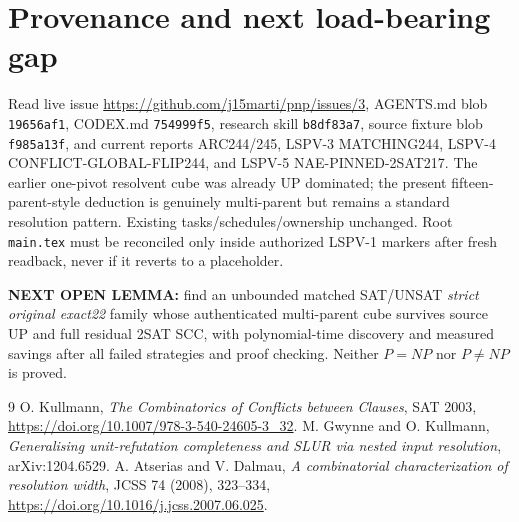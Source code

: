 \documentclass[10pt]{article}
\begin{document}
\section{Provenance and next load-bearing gap}
Read live issue \url{https://github.com/j15marti/pnp/issues/3}, AGENTS.md blob \texttt{19656af1}, CODEX.md \texttt{754999f5}, research skill \texttt{b8df83a7}, source fixture  blob \texttt{f985a13f}, and current reports ARC244/245, LSPV-3 MATCHING244, LSPV-4 CONFLICT-GLOBAL-FLIP244, and LSPV-5 NAE-PINNED-2SAT217. The earlier one-pivot resolvent cube was already UP dominated; the present fifteen-parent-style deduction is genuinely multi-parent but remains a standard resolution pattern. Existing tasks/schedules/ownership unchanged. Root \texttt{main.tex} must be reconciled only inside authorized LSPV-1 markers after fresh readback, never if it reverts to a placeholder.
\par\noindent\textbf{NEXT OPEN LEMMA:} find an unbounded matched SAT/UNSAT \emph{strict original exact22} family whose authenticated multi-parent cube survives source UP and full residual 2SAT SCC, with polynomial-time discovery and measured savings after all failed strategies and proof checking. Neither $P=NP$ nor $P\ne NP$ is proved.
\begin{thebibliography}{9}
 O. Kullmann, \emph{The Combinatorics of Conflicts between Clauses}, SAT 2003, \url{https://doi.org/10.1007/978-3-540-24605-3_32}.
 M. Gwynne and O. Kullmann, \emph{Generalising unit-refutation completeness and SLUR via nested input resolution}, arXiv:1204.6529.
 A. Atserias and V. Dalmau, \emph{A combinatorial characterization of resolution width}, JCSS 74 (2008), 323--334, \url{https://doi.org/10.1016/j.jcss.2007.06.025}.
\end{thebibliography}
\end{document}
